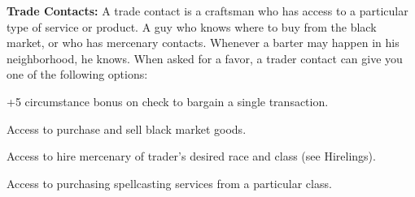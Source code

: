 \textbf{Trade Contacts:} A trade contact is a craftsman who has access to a particular type of service or product. A guy who knows where to buy from the black market, or who has mercenary contacts. Whenever a barter may happen in his neighborhood, he knows. When asked for a favor, a trader contact can give you one of the following options:

\begin{itemize*}
\item +5 circumstance bonus on  check to bargain a single transaction.
\item Access to purchase and sell black market goods.
\item Access to hire mercenary of trader's desired race and class (see Hirelings).
\item Access to purchasing spellcasting services from a particular class.
\end{itemize*}